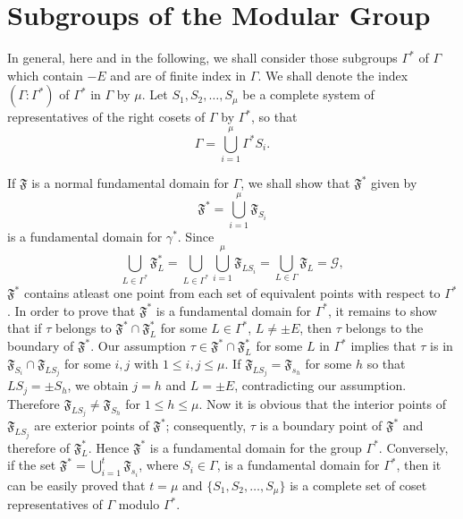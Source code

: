 \section{Subgroups of the Modular Group}\label{chap2:sec2}

In general, here and in the following, we shall consider those
subgroups $\Gamma^{\ast}$ of $\Gamma$ which contain $-E$ and are of
finite index in $\Gamma$. We shall denote the index
$(\Gamma:\Gamma^{\ast})$ of $\Gamma^{\ast}$ in $\Gamma$ by $\mu$. Let
$S_1, S_2, \ldots, S_{\mu}$ be a complete system of representatives
of the right cosets of $\Gamma$ by $\Gamma^{\ast}$, so that 
$$
\Gamma = \bigcup^{\mu}_{i=1} \Gamma^{\ast} S_i.
$$

If \pageoriginale $\mathfrak{F}$ is a normal fundamental domain for
$\Gamma$, we shall show that $\mathfrak{F}^{\ast}$ given by 
$$
\mathfrak{F}^{\ast} = \bigcup^{\mu}_{i=1} \mathfrak{F}_{S_i}
$$
is a fundamental domain for $\gamma^{\ast}$. Since 
$$
\bigcup_{L\in \Gamma^{\ast}} \mathfrak{F}^{\ast}_L =
\bigcup_{L\in \Gamma^{\ast}} \bigcup^{\mu}_{i=1}
\mathfrak{F}_{LS_i} = \bigcup_{L \in \Gamma} \mathfrak{F}_L =
\mathscr{G}, 
$$
$\mathfrak{F}^{\ast}$ contains atleast one point from each set of
equivalent points with respect to $\Gamma^{\ast}$. In order to prove
that $\mathfrak{F}^{\ast}$ is a fundamental domain for
$\Gamma^{\ast}$, it remains to show that if $\tau$ belongs to
$\mathfrak{F}^{\ast} \cap \mathfrak{F}^{\ast}_L$ for some
$L\in \Gamma^{\ast}$, $L\neq \pm E$, then $\tau$ belongs to
the boundary of $\mathfrak{F}^{\ast}$. Our assumption $\tau\in
\mathfrak{F}^{\ast} \cap \mathfrak{F}^{\ast}_L$ for some $L$ in
$\Gamma^{\ast}$ implies that $\tau$ is in $\mathfrak{F}_{S_i} \cap
\mathfrak{F}_{LS_j}$ for some $i,j$ with $1\leq i, j\leq \mu$. If
$\mathfrak{F}_{LS_j} = \mathfrak{F}_{s_h}$ for some $h$ so that $LS_j
= \pm S_h$, we obtain $j=h$ and $L=\pm E$, contradicting our
assumption. Therefore $\mathfrak{F}_{LS_j} \neq \mathfrak{F}_{S_h}$
for $1\leq h \leq \mu$. Now it is obvious that the interior points of
$\mathfrak{F}_{LS_j}$ are exterior points of $\mathfrak{F}^{\ast}$;
consequently, $\tau$ is a boundary point of $\mathfrak{F}^{\ast}$ and
therefore of $\mathfrak{F}^{\ast}_L$. Hence $\mathfrak{F}^{\ast}$ is a
fundamental domain for the group $\Gamma^{\ast}$. Conversely, if the
set $\mathfrak{F}^{\ast} = \bigcup\limits^{t}_{i=1} \mathfrak{F}_{s_i}$,
where $S_i \in \Gamma$, is a fundamental domain for
$\Gamma^{\ast}$, then it can be easily proved that $t=\mu$ and $\{S_1,
S_2, \ldots, S_{\mu}\}$ is a complete set of coset representatives of
$\Gamma$ modulo $\Gamma^{\ast}$.

